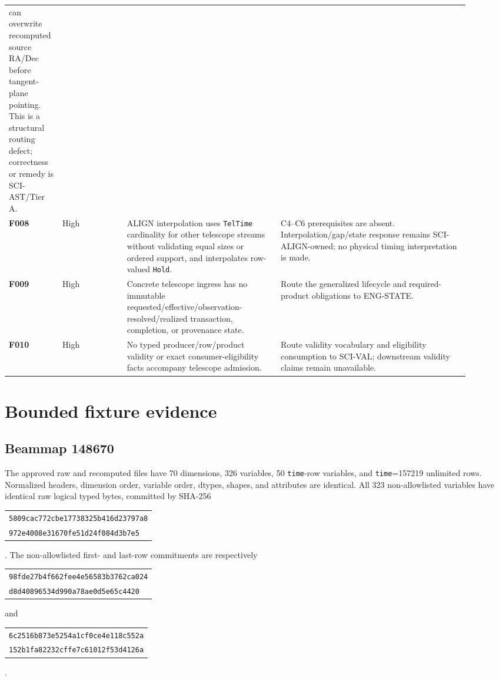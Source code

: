 \documentclass[11pt]{article}
\newcommand{\code}[1]{\texttt{#1}}
\newcommand{\finding}[1]{\textbf{#1}}
\begin{document}
\begin{longtable}{@{}L{0.09\linewidth}L{0.13\linewidth}L{0.31\linewidth}L{0.38\linewidth}@{}}
can overwrite recomputed source RA/Dec before tangent-plane pointing.  This is
a structural routing defect; correctness or remedy is SCI-AST/Tier A. \\
\finding{F008} & High & ALIGN interpolation uses \code{TelTime} cardinality for
other telescope streams without validating equal sizes or ordered support, and
interpolates row-valued \code{Hold}. & C4--C6 prerequisites are absent.
Interpolation/gap/state response remains SCI-ALIGN-owned; no physical timing
interpretation is made. \\
\finding{F009} & High & Concrete telescope ingress has no immutable
requested/effective/observation-resolved/realized transaction, completion, or
provenance state. & Route the generalized lifecycle and required-product
obligations to ENG-STATE. \\
\finding{F010} & High & No typed producer/row/product validity or exact
consumer-eligibility facts accompany telescope admission. & Route validity
vocabulary and eligibility consumption to SCI-VAL; downstream validity claims
remain unavailable. \\
\bottomrule
\end{longtable}

\section{Bounded fixture evidence}

\subsection{Beammap 148670}

The approved raw and recomputed files have 70 dimensions, 326 variables, 50
\code{time}-row variables, and \code{time}=157219 unlimited rows.  Normalized
headers, dimension order, variable order, dtypes, shapes, and attributes are
identical.  All 323 non-allowlisted variables have identical raw logical typed
bytes, committed by SHA-256
\begin{tabular}[t]{@{}l@{}}
\code{5809cac772cbe17738325b416d23797a8}\\
\code{972e4008e31670fe51d24f084d3b7e5}
\end{tabular}.
The non-allowlisted first- and last-row commitments are respectively
\begin{tabular}[t]{@{}l@{}}
\code{98fde27b4f662fee4e56583b3762ca024}\\
\code{d8d40896534d990a78ae0d5e65c4420}
\end{tabular}
and
\begin{tabular}[t]{@{}l@{}}
\code{6c2516b873e5254a1cf0ce4e118c552a}\\
\code{152b1fa82232cffe7c61012f53d4126a}
\end{tabular}.
\end{document}
